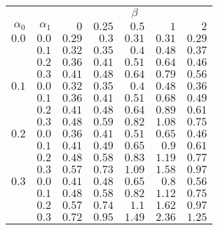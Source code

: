 \begin{tabular}{rr|rrrrr}
\hline\hline
 && \multicolumn{5}{c}{$\beta$}\\
 $\alpha_0$ & $\alpha_1$ & $0$ & $0.25$ & $0.5$ & $1$ & $2$ \\ 
 \hline
$0.0$ & $0.0$ & $0.29$ & $0.3$ & $0.31$ & $0.31$ & $0.29$\\ 
 & $0.1$ & $0.32$ & $0.35$ & $0.4$ & $0.48$ & $0.37$\\ 
 & $0.2$ & $0.36$ & $0.41$ & $0.51$ & $0.64$ & $0.46$\\ 
 & $0.3$ & $0.41$ & $0.48$ & $0.64$ & $0.79$ & $0.56$\\ 
\hline 
 $0.1$ & $0.0$ & $0.32$ & $0.35$ & $0.4$ & $0.48$ & $0.36$\\ 
 & $0.1$ & $0.36$ & $0.41$ & $0.51$ & $0.68$ & $0.49$\\ 
 & $0.2$ & $0.41$ & $0.48$ & $0.64$ & $0.89$ & $0.61$\\ 
 & $0.3$ & $0.48$ & $0.59$ & $0.82$ & $1.08$ & $0.75$\\ 
\hline 
 $0.2$ & $0.0$ & $0.36$ & $0.41$ & $0.51$ & $0.65$ & $0.46$\\ 
 & $0.1$ & $0.41$ & $0.49$ & $0.65$ & $0.9$ & $0.61$\\ 
 & $0.2$ & $0.48$ & $0.58$ & $0.83$ & $1.19$ & $0.77$\\ 
 & $0.3$ & $0.57$ & $0.73$ & $1.09$ & $1.58$ & $0.97$\\ 
\hline 
 $0.3$ & $0.0$ & $0.41$ & $0.48$ & $0.65$ & $0.8$ & $0.56$\\ 
 & $0.1$ & $0.48$ & $0.58$ & $0.82$ & $1.12$ & $0.75$\\ 
 & $0.2$ & $0.57$ & $0.74$ & $1.1$ & $1.62$ & $0.97$\\ 
 & $0.3$ & $0.72$ & $0.95$ & $1.49$ & $2.36$ & $1.25$\\ 
 \hline 
 \end{tabular}